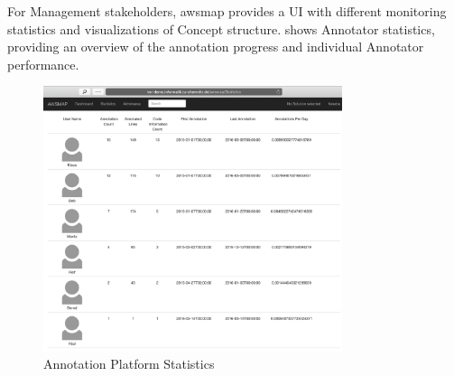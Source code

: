 For Management stakeholders, \gls{awsmap} provides a UI with different monitoring statistics and visualizations of \gls{Concept} structure.
 shows Annotator statistics, providing an overview of the annotation progress and individual Annotator performance.
\pagebreak 
\begin{figure}[h!]
\hypertarget{fig:awsmap.statistics}{%
\centering
\includegraphics[width=0.78\textwidth]{../figures/screenshots/ap-statistics-result2.png}
\caption{Annotation Platform Statistics}\label{fig:awsmap.statistics}
}
\end{figure}

